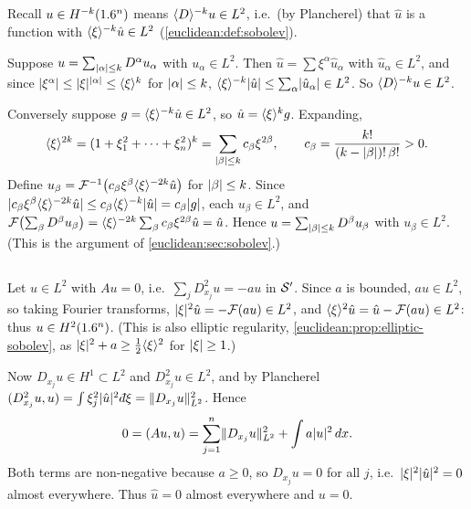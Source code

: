 \subsection*{}
Recall $u\in H^{-k}(1.6^n)$ means $\langle D\rangle^{-k}u\in L^2$, i.e.\ (by Plancherel) that $\hat u$ is a
function with $\langle \xi\rangle^{-k}\hat u\in L^2$ (\cref{euclidean:def:sobolev}).

Suppose $u=\sum_{\lvert \alpha\rvert\le k}D^\alpha u_\alpha$ with $u_\alpha\in L^2$. Then
$\hat u=\sum\xi^\alpha\hat u_\alpha$ with $\hat u_\alpha\in L^2$, and since
$\lvert \xi^\alpha\rvert\le\lvert \xi\rvert^{\lvert \alpha\rvert}\le\langle \xi\rangle^k$ for $\lvert \alpha\rvert\le k$,
$\langle \xi\rangle^{-k}\lvert \hat u\rvert\le\sum_\alpha\lvert \hat u_\alpha\rvert\in L^2$. So $\langle D\rangle^{-k}u\in L^2$.

Conversely suppose $g=\langle \xi\rangle^{-k}\hat u\in L^2$, so $\hat u=\langle \xi\rangle^kg$. Expanding,
\begin{equation*}
  \langle \xi\rangle^{2k}=(1+\xi_1^2+\dots+\xi_n^2)^k=\sum_{\lvert \beta\rvert\le k}c_\beta\xi^{2\beta},\qquad
  c_\beta=\frac{k!}{(k-\lvert \beta\rvert)!\,\beta!}>0 .
\end{equation*}
Define $u_\beta=\mathcal{F}^{-1}\bigl(c_\beta\xi^\beta\langle \xi\rangle^{-2k}\hat u\bigr)$ for $\lvert \beta\rvert\le k$. Since
$\lvert c_\beta\xi^\beta\langle \xi\rangle^{-2k}\hat u\rvert\le c_\beta\langle \xi\rangle^{-k}\lvert \hat u\rvert=c_\beta\lvert g\rvert$, each
$u_\beta\in L^2$, and
$\mathcal{F}\bigl(\sum_\beta D^\beta u_\beta\bigr)=\langle \xi\rangle^{-2k}\sum_\beta c_\beta\xi^{2\beta}\hat u=\hat u$.
Hence $u=\sum_{\lvert \beta\rvert\le k}D^\beta u_\beta$ with $u_\beta\in L^2$. (This is the argument of
\cref{euclidean:sec:sobolev}.)

\subsection*{}
Let $u\in L^2$ with $Au=0$, i.e.\ $\sum_jD_{x_j}^2u=-au$ in $\mathcal{S}'$. Since $a$ is bounded, $au\in L^2$,
so taking Fourier transforms, $\lvert \xi\rvert^2\hat u=-\mathcal{F}(au)\in L^2$, and
$\langle \xi\rangle^2\hat u=\hat u-\mathcal{F}(au)\in L^2$: thus $u\in H^2(1.6^n)$. (This is also elliptic regularity,
\cref{euclidean:prop:elliptic-sobolev}, as $\lvert \xi\rvert^2+a\ge\frac12\langle \xi\rangle^2$ for $\lvert \xi\rvert\ge1$.)

Now $D_{x_j}u\in H^1\subset L^2$ and $D_{x_j}^2u\in L^2$, and by Plancherel
$\inner{D_{x_j}^2u}u=\int\xi_j^2\abs{\hat u}^2\,\dbar\xi=\norm{D_{x_j}u}_{L^2}^2$. Hence
\begin{equation*}
  0=( Au, u)=\sum_{j=1}^n\lVert D_{x_j}u\rVert_{L^2}^2+\int a\lvert u\rvert^2\,dx .
\end{equation*}
Both terms are non-negative because $a\ge0$, so $D_{x_j}u=0$ for all $j$, i.e.\
$\lvert \xi\rvert^2\lvert \hat u\rvert^2=0$ almost everywhere. Thus $\hat u=0$ almost everywhere and $u=0$.

